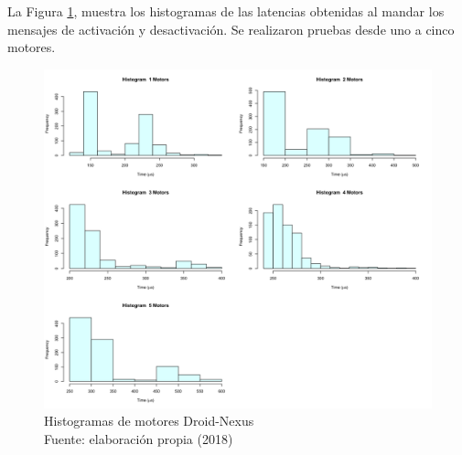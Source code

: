La Figura \ref{fig:droid-nexus-hist-motors}, muestra los histogramas de las latencias obtenidas al mandar los mensajes de activación y desactivación. Se realizaron pruebas desde uno a cinco motores.

\begin{figure}
 \begin{center} 
   	\includegraphics[width=1.0\textwidth]{evaluation/graphics/Droid/Nexus/HistMotorsDroidNexus.png} 
    \caption[Histogramas de motores Droid-Nexus]{Histogramas de motores  Droid-Nexus\\Fuente: elaboración propia (2018)} 
    \label{fig:droid-nexus-hist-motors}
  \end{center}
\end{figure}

